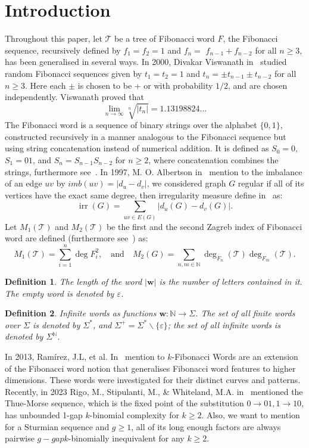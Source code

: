 \documentclass[12pt, a4paper]{article}
\newtheorem{definition}{Definition}
\begin{document}
\section{Introduction}\label{sec1}
Throughout this paper, let $\mathscr{T}$ be a tree of Fibonacci word $F$, the Fibonacci sequence, recursively defined by $f_{1}=f_{2}=1$ and $f_{n}=$ $f_{n-1}+f_{n-2}$ for all $n \geq 3$, has been generalised in several ways. In 2000, Divakar Viswanath in~\cite{Viswanath} studied random Fibonacci sequences given by $t_{1}=t_{2}=1$ and $t_{n}= \pm t_{n-1} \pm t_{n-2}$ for all $n \geq 3$. Here each $\pm$ is chosen to be + or with probability $1 / 2$, and are chosen independently. Viswanath proved that
\[
\lim _{n \rightarrow \infty} \sqrt[n]{\left|t_{n}\right|}=1.13198824 \ldots
\]
The Fibonacci word is a sequence of binary strings over the alphabet $\{0, 1\}$, constructed recursively in a manner analogous to the Fibonacci sequence but using string concatenation instead of numerical addition. It is defined as $S_0 = 0$, $S_1 = 01$, and $S_n = S_{n-1} S_{n-2}$ for $n \geq 2$, where concatenation combines the strings, furthermore see~\cite{BerstelQWE,lenr,MonnerotDumaine}. In 1997,  M. O. Albertson in~\cite{ALBERTSON} mention to the imbalance of an edge $uv$ by $imb(uv)=\lvert d_u-d_v\rvert$, we considered graph $G$ regular if all of its vertices have the exact same degree, then irregularity measure define in~\cite{ALBERTSON, GUTMAN2, Brandt} as: 
\[
\operatorname{irr}(G)=\sum_{uv\in E(G)}\lvert d_u(G)-d_v(G) \rvert.
\]
Let $M_1(\mathscr{T})$ and $M_2(\mathscr{T})$  be the first and the second Zagreb index of Fibonacci word are defined (furthermore see~\cite{TRINAJSTIC, WILCOX,ALBERTSON}) as: 
\[
M_1(\mathscr{T})=\sum_{i=1}^{n}\deg F_i^2, \quad \text{and} \quad M_2(G)=\sum_{n,m\in \mathbb{N}} \deg_{F_n}(\mathscr{T})\deg_{F_m}(\mathscr{T}).
\]
\begin{definition}
The length of the word $|\mathbf{w}|$ is the number of letters contained in it. The empty word is denoted by $\varepsilon$.
\end{definition}
\begin{definition}
Infinite words as functions $\mathbf{w}: \mathbb{N} \rightarrow \Sigma$. The set of all finite words over $\Sigma$ is denoted by $\Sigma^{*}$, and $\Sigma^{+}=\Sigma^{*} \backslash\{\varepsilon\}$; the set of all infinite words is denoted by $\Sigma^{\mathbb{N}}$.
\end{definition}
In 2013, Ramírez, J.L, et al. In~\cite{Ramírez} mention to $k$-Fibonacci Words  are an extension of the Fibonacci word notion that generalises Fibonacci word features to higher dimensions. These words were investigated for their distinct curves and patterns. Recently, in 2023 Rigo, M., Stipulanti, M., \& Whiteland, M.A. in~\cite{R3} mentioned the Thue-Morse sequence, which is the fixed point of the substitution $0\rightarrow 01, 1\rightarrow 10$, has unbounded 1-gap $k$-binomial complexity for $k \geq 2$. Also,  we want to mention for a Sturmian sequence and $g\geq 1$, all of its long enough factors are always pairwise $g-gap k$-binomially inequivalent for any $k \geq 2$. 
\end{document}
